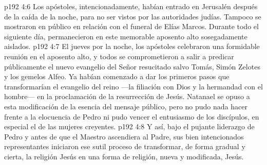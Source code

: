 \vs p192 4:6 \pc Los apóstoles, intencionadamente, habían entrado en Jerusalén después de la caída de la noche, para no ser vistos por las autoridades judías. Tampoco se mostraron en público en relación con el funeral de Elías Marcos. Durante todo el siguiente día, permanecieron en este memorable aposento alto sosegadamente aislados.
\vs p192 4:7 El jueves por la noche, los apóstoles celebraron una formidable reunión en el aposento alto, y todos se comprometieron a salir a predicar públicamente el nuevo evangelio del Señor resucitado salvo Tomás, Simón Zelotes y los gemelos Alfeo. Ya habían comenzado a dar los primeros pasos que transformarían el evangelio del reino ---la filiación con Dios y la hermandad con el hombre--- en la proclamación de la resurrección de Jesús. Natanael se opuso a esta modificación de la esencia del mensaje público, pero no pudo nada hacer frente a la elocuencia de Pedro ni pudo vencer el entusiasmo de los discípulos, en especial el de las mujeres creyentes.
\vs p192 4:8 Y así, bajo el pujante liderazgo de Pedro y antes de que el Maestro ascendiera al Padre, sus bien intencionados representantes iniciaron ese sutil proceso de transformar, de forma gradual y cierta, la religión  Jesús en una forma de religión, nueva y modificada,  Jesús.
